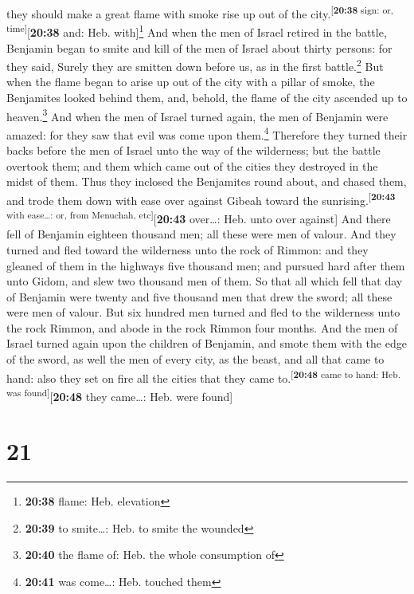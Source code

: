 they should make a great flame with smoke rise up out of the
city.\textsuperscript{{[}\textbf{20:38} sign: or,
time{]}}{[}\textbf{20:38} and: Heb. with{]}\footnote{\textbf{20:38}
  flame: Heb. elevation}  And when the men of Israel
retired in the battle, Benjamin began to smite and kill of the men of
Israel about thirty persons: for they said, Surely they are smitten down
before us, as in the first battle.\footnote{\textbf{20:39} to
  smite\ldots: Heb. to smite the wounded}  But when the
flame began to arise up out of the city with a pillar of smoke, the
Benjamites looked behind them, and, behold, the flame of the city
ascended up to heaven.\footnote{\textbf{20:40} the flame of: Heb. the
  whole consumption of}  And when the men of Israel
turned again, the men of Benjamin were amazed: for they saw that evil
was come upon them.\footnote{\textbf{20:41} was come\ldots: Heb. touched
  them}  Therefore they turned their backs before the men
of Israel unto the way of the wilderness; but the battle overtook them;
and them which came out of the cities they destroyed in the midst of
them.  Thus they inclosed the Benjamites round about, and
chased them, and trode them down with ease over against Gibeah toward
the sunrising.\textsuperscript{{[}\textbf{20:43} with ease\ldots: or,
from Menuchah, etc{]}}{[}\textbf{20:43} over\ldots: Heb. unto over
against{]}  And there fell of Benjamin eighteen thousand
men; all these were men of valour.  And they turned and
fled toward the wilderness unto the rock of Rimmon: and they gleaned of
them in the highways five thousand men; and pursued hard after them unto
Gidom, and slew two thousand men of them.  So that all
which fell that day of Benjamin were twenty and five thousand men that
drew the sword; all these were men of valour.  But six
hundred men turned and fled to the wilderness unto the rock Rimmon, and
abode in the rock Rimmon four months.  And the men of
Israel turned again upon the children of Benjamin, and smote them with
the edge of the sword, as well the men of every city, as the beast, and
all that came to hand: also they set on fire all the cities that they
came to.\textsuperscript{{[}\textbf{20:48} came to hand: Heb. was
found{]}}{[}\textbf{20:48} they came\ldots: Heb. were found{]}

\hypertarget{section-20}{%
\section{21}\label{section-20}}

